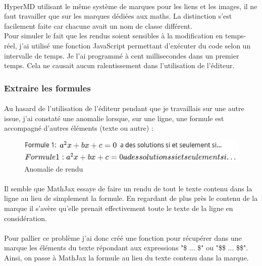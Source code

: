 \documentclass[12pt]{article}
\begin{document}
\paragraph{}
HyperMD utilisant le même système de marques pour les liens et les images, il ne faut travailler que sur les marques dédiées aux maths. La distinction s'est facilement faite car chacune avait un nom de classe différent.\\
Pour simuler le fait que les rendus soient sensibles à la modification en temps-réel, j'ai utilisé une fonction JavaScript permettant d'exécuter du code selon un intervalle de temps. Je l'ai programmé à cent millisecondes dans un premier temps. Cela ne causait aucun ralentissement dans l'utilisation de l'éditeur.\\

\subsubsection{Extraire les formules}
\paragraph{}
Au hasard de l'utilisation de l'éditeur pendant que je travaillais sur une autre issue, j'ai constaté une anomalie lorsque, sur une ligne, une formule est accompagné d'autres éléments (texte ou autre) :

\begin{figure}[H]
    \centering
    \includegraphics[scale=0.9]{gallery/whole_line.jpg}
    \caption[nom dans le sommaire]{Anomalie de rendu}
    \label{fig:gallery6}
\end{figure}

\paragraph{}
Il semble que MathJax essaye de faire un rendu de tout le texte contenu dans la ligne au lieu de simplement la formule. En regardant de plus près le contenu de la marque il s'avère qu'elle prenait effectivement toute le texte de la ligne en considération.
\paragraph{}
Pour pallier ce problème j'ai donc créé une fonction pour récupérer dans une marque les éléments du texte répondant aux expressions "\$ ... \$" ou "\$\$ ... \$\$". Ainsi, on passe à MathJax la formule au lieu du texte contenu dans la marque.
\end{document}
